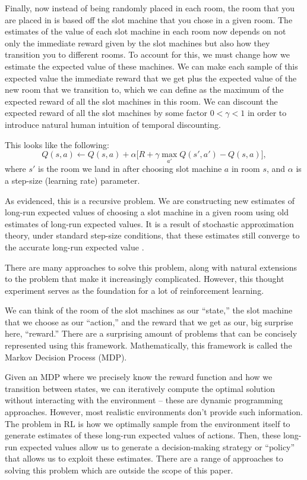 \documentclass{article}
\begin{document}
Finally, now instead of being randomly placed in each room, the room that you are placed in is based off the slot machine that you chose in a given room. The estimates of the value of each slot machine in each room now depends on not only the immediate reward given by the slot machines but also how they transition you to different rooms. To account for this, we must change how we estimate the expected value of these machines. We can make each sample of this expected value the immediate reward that we get plus the expected value of the new room that we transition to, which we can define as the maximum of the expected reward of all the slot machines in this room. We can discount the expected reward of all the slot machines by some factor $0 < \gamma < 1$ in order to introduce natural human intuition of temporal discounting.

This looks like the following:
\begin{equation}
Q(s,a) \leftarrow Q(s,a) + \alpha\Big[R + \gamma \max_{a'} Q(s',a') - Q(s,a)\Big],
\end{equation}
where $s'$ is the room we land in after choosing slot machine $a$ in room $s$, and $\alpha$ is a step-size (learning rate) parameter.


As evidenced, this is a recursive problem. We are constructing new estimates of long-run expected values of choosing a slot machine in a given room using old estimates of long-run expected values. It is a result of stochastic approximation theory, under standard step-size conditions, that these estimates still converge to the accurate long-run expected value \citep{suttonbarto2018}.

There are many approaches to solve this problem, along with natural extensions to the problem that make it increasingly complicated. However, this thought experiment serves as the foundation for a lot of reinforcement learning.

We can think of the room of the slot machines as our ``state,'' the slot machine that we choose as our ``action,'' and the reward that we get as our, big surprise here, ``reward.'' There are a surprising amount of problems that can be concisely represented using this framework. Mathematically, this framework is called the Markov Decision Process (MDP).

Given an MDP where we precisely know the reward function and how we transition between states, we can iteratively compute the optimal solution without interacting with the environment -- these are dynamic programming approaches. However, most realistic environments don't provide such information. The problem in RL is how we optimally sample from the environment itself to generate estimates of these long-run expected values of actions. Then, these long-run expected values allow us to generate a decision-making strategy or ``policy'' that allows us to exploit these estimates. There are a range of approaches to solving this problem which are outside the scope of this paper.
\end{document}
